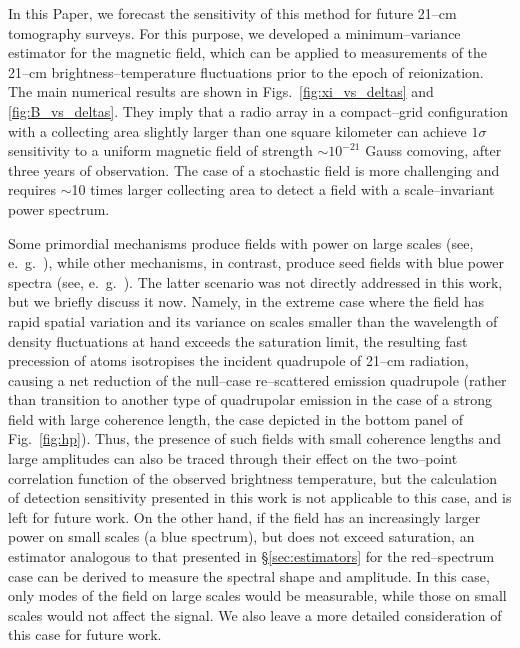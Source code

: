 \documentclass[aps,prd,twocolumn,floatfix,showpacs,superscriptaddress,nofootinbib]{revtex4-1}
\begin{document}
In this Paper, we forecast the sensitivity of this method for future 21--cm tomography surveys. For this purpose, we developed a minimum--variance estimator for the magnetic field, which can be applied to measurements of the 21--cm brightness--temperature fluctuations prior to the epoch of reionization. The main numerical results are shown in Figs.~\ref{fig:xi_vs_deltas} and \ref{fig:B_vs_deltas}. They imply that a radio array in a compact--grid configuration with a collecting area slightly larger than one square kilometer can achieve $1\sigma$ sensitivity to a uniform magnetic field of strength $\sim$$10^{-21}$ Gauss comoving, after three years of observation. The case of a stochastic field is more challenging and requires $\sim$10 times larger collecting area to detect a field with a scale--invariant power spectrum. 

Some primordial mechanisms produce fields with power on large scales (see, e.~g.~\cite{2001PhLB..501..165D}), while other mechanisms, in contrast, produce seed fields with blue power spectra (see, e.~g.~\cite{2006Sci...311..827I,Naoz13}). The latter scenario was not directly addressed in this work, but we briefly discuss it now. Namely, in the extreme case where the field has rapid spatial variation and its variance on scales smaller than the wavelength of density fluctuations at hand exceeds the saturation limit, the resulting fast precession of atoms isotropises the incident quadrupole of 21--cm radiation, causing a net reduction of the null--case re--scattered emission quadrupole (rather than transition to another type of quadrupolar emission in the case of a strong field with large coherence length, the case depicted in the bottom panel of Fig.~\ref{fig:hp}). Thus, the presence of such fields with small coherence lengths and large amplitudes can also be traced through their effect on the two--point correlation function of the observed brightness temperature, but the calculation of detection sensitivity presented in this work is not applicable to this case, and is left for future work. On the other hand, if the field has an increasingly larger power on small scales (a blue spectrum), but does not exceed saturation, an estimator analogous to that presented in \S\ref{sec:estimators} for the red--spectrum case can be derived to measure the spectral shape and amplitude. In this case, only modes of the field on large scales would be measurable, while those on small scales would not affect the signal. We also leave a more detailed consideration of this case for future work.
\end{document}
